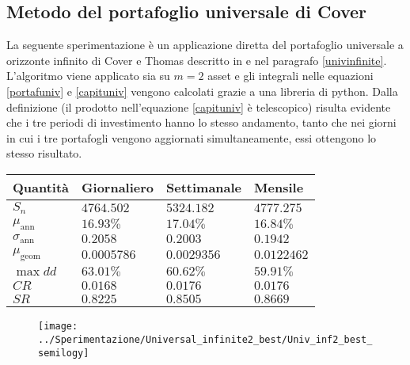 \documentclass[a4paper,11pt]{book}
\theoremstyle{plain}
\theoremstyle{definition}
\theoremstyle{remark}
\begin{document}
\subsection{Metodo del portafoglio universale di Cover}
La seguente sperimentazione è un applicazione diretta del portafoglio universale a orizzonte infinito di Cover e Thomas descritto in \cite{CTElInfTeo} e nel paragrafo \ref{univinfinite}. L'algoritmo viene applicato sia su $m=2$ asset e gli integrali nelle equazioni \ref{portafuniv} e \ref{capituniv} vengono calcolati grazie a una libreria di python.\newline
Dalla definizione (il prodotto nell'equazione \ref{capituniv} è telescopico) risulta evidente che i tre periodi di investimento hanno lo stesso andamento, tanto che nei giorni in cui i tre portafogli vengono aggiornati simultaneamente, essi ottengono lo stesso risultato.
\begin{table}[H]
	\centering
	\begin{tabular}{|l|l|l|l|}
		\hline
		Quantità 			  & Giornaliero	 & Settimanale 	& Mensile		\\\hline
		$S_n$                 & $4764.502$   & $5324.182$	& $4777.275$ 	\\
		$\mu_{\text{ann}}$    & $16.93\%$    & $17.04\%$	& $16.84\%$		\\
		$\sigma_{\text{ann}}$ & $0.2058$     & $0.2003$		& $0.1942$		\\
		$\mu_{\text{geom}}$   & $0.0005786$  & $0.0029356$	& $0.0122462$	\\
		$\max dd$             & $63.01\%$    & $60.62\%$	& $59.91\%$		\\
		$CR$                  & $0.0168$     & $0.0176$		& $0.0176$		\\
		$SR$                  & $0.8225$     & $0.8505$		& $0.8669$		\\\hline
	\end{tabular}
\end{table}
\begin{figure}[H]
	\centering
	\texttt{[image: ../Sperimentazione/Universal\_infinite2\_best/Univ\_inf2\_best\_semilogy]}
	\caption{}
	\label{fig:univinf2bestsemilogy}
\end{figure}
\end{document}
